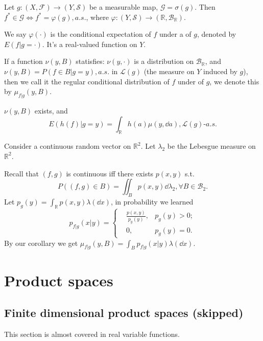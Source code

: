 Let $g:(X, \mathscr{F}) \to (Y, \mathscr{S})$ be a measurable map,
$\mathscr{G} = \sigma(g)$.
Then $f^*\in \mathscr{G} \iff f^* = \varphi(g), a.s.$,
where $\varphi:(Y, \mathscr{S}) \to (\mathbb{R}, \mathscr{B}_{\mathbb{R}})$.

\begin{definition}
	We say $\varphi(\cdot)$ is the conditional expectation of $f$ under
	a  of $g$, denoted by $E(f|g = \cdot)$.
	It's a real-valued function on $Y$.
\end{definition}
\begin{definition}
	If a function $\nu(y, B)$ statisfies:
	$\nu(y, \cdot)$ is a distribution on $\mathscr{B}_{\mathbb{R}}$,
	and $\nu(y, B) = P(f\in B| g = y), a.s.$ in $\mathscr{L}(g)$ (the measure on $Y$
	induced by $g$), then we call it the regular conditional distribution of $f$
	under  of $g$, we denote this by $\mu_{f|g}(y, B)$.
\end{definition}

\begin{corollary}
    $\nu(y, B)$ exists, and
	\[
	E(h(f)| g=y) = \int_{\mathbb{R}} h(a)\mu(y, \dd a), \mathscr{L}(g)\text{-}a.s.
	\]
\end{corollary}
\begin{example}
    Consider a continuous random vector on $\mathbb{R}^2$.
	Let $\lambda_2$ be the Lebesgue measure on $\mathbb{R}^2$.

	Recall that $(f, g)$ is continuous iff there exists $p(x, y)$ s.t.
	\[
	P((f,g)\in B) = \iint_{B} p(x, y)\dd \lambda_2, \forall B\in \mathscr{B}_2.
	\]
	Let $p_g(y) = \int_{\mathbb{R}} p(x, y)\lambda(\dd x)$,
	in probability we learned
	\[
	p_{f|g}(x|y) = \left\{
	\begin{aligned}
		&\frac{p(x, y)}{p_g(y)}, &p_g(y) > 0;\\
		&0, &p_g(y) = 0.
	\end{aligned}\right.
	\]
	By our corollary we get $\mu_{f|g}(y, B) = \int_Bp_{f|g}(x|y)\lambda(\dd x)$.
\end{example}

\section{Product spaces}
\label{sec:Product spaces}
\subsection{Finite dimensional product spaces (skipped)}
\label{sub:Finite dimensional product spaces}
This section is almost covered in real variable functions.

